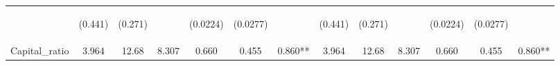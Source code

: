 \documentclass[]{article}
\begin{document}
\begin{center}
\begin{tabular}{lcccccccccccc}
\vspace{4pt} & \begin{footnotesize}(0.441)\end{footnotesize} & \begin{footnotesize}(0.271)\end{footnotesize} & \begin{footnotesize}\end{footnotesize} & \begin{footnotesize}(0.0224)\end{footnotesize} & \begin{footnotesize}(0.0277)\end{footnotesize} & \begin{footnotesize}\end{footnotesize} & \begin{footnotesize}(0.441)\end{footnotesize} & \begin{footnotesize}(0.271)\end{footnotesize} & \begin{footnotesize}\end{footnotesize} & \begin{footnotesize}(0.0224)\end{footnotesize} & \begin{footnotesize}(0.0277)\end{footnotesize} & \begin{footnotesize}\end{footnotesize} \\
Capital\_ratio & 3.964 & 12.68 & 8.307 & 0.660 & 0.455 & 0.860** & 3.964 & 12.68 & 8.307 & 0.660 & 0.455 & 0.860** \\

\end{tabular}
\end{center}
\end{document}
